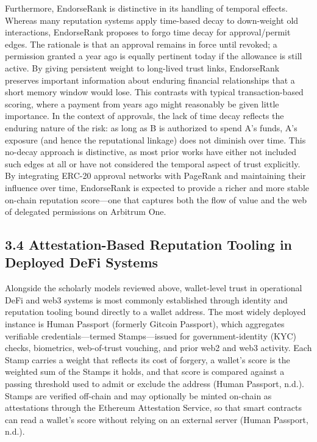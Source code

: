 Furthermore, EndorseRank is distinctive in its handling of temporal effects. Whereas many reputation systems apply time-based decay to down-weight old interactions, EndorseRank proposes to forgo time decay for approval/permit edges. The rationale is that an approval remains in force until revoked; a permission granted a year ago is equally pertinent today if the allowance is still active. By giving persistent weight to long-lived trust links, EndorseRank preserves important information about enduring financial relationships that a short memory window would lose. This contrasts with typical transaction-based scoring, where a payment from years ago might reasonably be given little importance. In the context of approvals, the lack of time decay reflects the enduring nature of the risk: as long as B is authorized to spend A's funds, A's exposure (and hence the reputational linkage) does not diminish over time. This no-decay approach is distinctive, as most prior works have either not included such edges at all or have not considered the temporal aspect of trust explicitly. By integrating ERC-20 approval networks with PageRank and maintaining their influence over time, EndorseRank is expected to provide a richer and more stable on-chain reputation score---one that captures both the flow of value and the web of delegated permissions on Arbitrum One.


\subsection*{3.4 Attestation-Based Reputation Tooling in Deployed DeFi Systems}
\label{sec:attestation-based-reputation-tooling}

Alongside the scholarly models reviewed above, wallet-level trust in operational DeFi and web3 systems is most commonly established through identity and reputation tooling bound directly to a wallet address. The most widely deployed instance is Human Passport (formerly Gitcoin Passport), which aggregates verifiable credentials---termed Stamps---issued for government-identity (KYC) checks, biometrics, web-of-trust vouching, and prior web2 and web3 activity. Each Stamp carries a weight that reflects its cost of forgery, a wallet's score is the weighted sum of the Stamps it holds, and that score is compared against a passing threshold used to admit or exclude the address (Human Passport, n.d.). Stamps are verified off-chain and may optionally be minted on-chain as attestations through the Ethereum Attestation Service, so that smart contracts can read a wallet's score without relying on an external server (Human Passport, n.d.).


